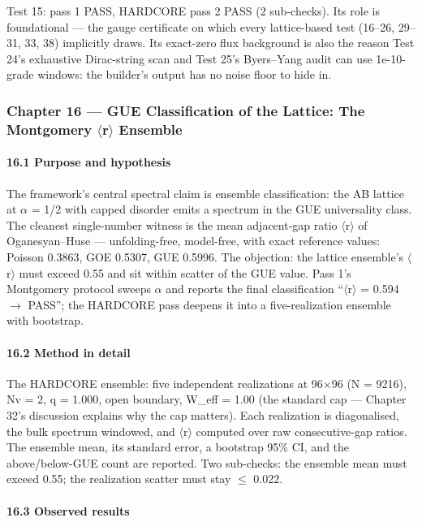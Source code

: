 \documentclass[10pt]{article}
\begin{document}
Test 15: pass 1 PASS, HARDCORE pass 2 PASS (2 sub-checks). Its role is foundational --- the gauge certificate on which every lattice-based test (16--26, 29--31, 33, 38) implicitly draws. Its exact-zero flux background is also the reason Test 24's exhaustive Dirac-string scan and Test 25's Byers--Yang audit can use 1e-10-grade windows: the builder's output has no noise floor to hide in.

\subsubsection{Chapter 16 --- GUE Classification of the Lattice: The Montgomery $\langle$r$\rangle$ Ensemble}

\paragraph{16.1 Purpose and hypothesis}

The framework's central spectral claim is ensemble classification: the AB lattice at $\alpha$ = 1/2 with capped disorder emits a spectrum in the GUE universality class. The cleanest single-number witness is the mean adjacent-gap ratio $\langle$r$\rangle$ of Oganesyan--Huse --- unfolding-free, model-free, with exact reference values: Poisson 0.3863, GOE 0.5307, GUE 0.5996. The objection: the lattice ensemble's $\langle$r$\rangle$ must exceed 0.55 and sit within scatter of the GUE value. Pass 1's Montgomery protocol sweeps $\alpha$ and reports the final classification ``$\langle$r$\rangle$ = 0.594 $\rightarrow$ PASS''; the HARDCORE pass deepens it into a five-realization ensemble with bootstrap.

\paragraph{16.2 Method in detail}

The HARDCORE ensemble: five independent realizations at 96$\times$96 (N = 9216), Nv = 2, q = 1.000, open boundary, W\_eff = 1.00 (the standard cap --- Chapter 32's discussion explains why the cap matters). Each realization is diagonalised, the bulk spectrum windowed, and $\langle$r$\rangle$ computed over raw consecutive-gap ratios. The ensemble mean, its standard error, a bootstrap 95\% CI, and the above/below-GUE count are reported. Two sub-checks: the ensemble mean must exceed 0.55; the realization scatter must stay $\le$ 0.022.

\paragraph{16.3 Observed results}
\end{document}
